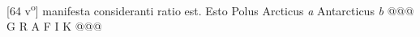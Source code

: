 [64 v\textsuperscript{o}] manifesta consideranti ratio est. Esto Polus  Arcticus\protect{} \textit{a} Antarcticus\protect{} \textit{b} @@@ G R A F I K @@@%
